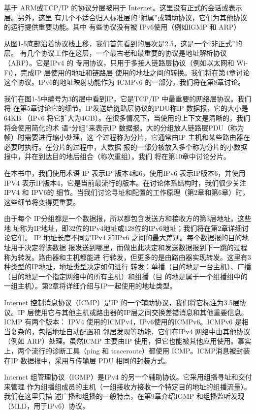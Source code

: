 基于 ARM或TCP/IP 的协议分层被用于 Internet。这里没有正式的会话或表示层。另外，这里
有几个不适合归人标准层的“附属”或辅助协议，它们为其他协议的运行提供重要功能。其中
有些协议没有被 IPv6使用（例如IGMP 和 ARP）

从图1-5底部沿着协议栈上移，我们首先看到的层次是2.5，这是一个“非正式”的层。
有几个协议工作在这层，一个最古老和最重要的协议是地址解析协议（ARP）。它是IPv4 的
专用协议，只用于多接人链路层协议（例如以太网和 Wi-Fi），完成IP 层使用的地址和链路层
使用的地址之间的转换。我们将在第4章讨论这个协议。IPv6的地址映射功能作为 ICMPv6
的一部分，我们将在第8章讨论。

我们在图1-5中编号为3的层中看到IP，它是TCP/IP 中最重要的网络层协议。我们将
在第5章讨论它的细节。IP发送给链路层协议的PDU称IP 数据报，它的大小是64KB
（IPv6 将它扩大为4GB）。在很多情况下，当使用的上下文是清晰的，我们将会使用简化的术
语“分组”来表示IP 数据报。大的分组放人链路层PDU（称为帧）时需要进行缩小处理，这
个过程称为分片，它通常由IP 主机和某些路由器在必要时执行。在分片的过程中，大数据
报的一部分被放入多个称为分片的小数据报中，并在到达目的地后组合（称次重组）。我们
将在第10章中讨论分片。

在本书中，我们使用术语 IP 表示IP 版本4和6，使用IPv6 表示IP版本6，并使用 IPV4
表示IP版本4，它是当前最流行的版本。在讨论体系结构时，我们很少关注IPV4 和 IPV6的
细节。当我们讨论寻址和配置的工作原理（第2章和第6章）时，这些细节将变得更重要。

由于每个 IP分组都是一个数据报，所以都包含发送方和接收方的第3层地址。这些地
址称为IP地址，即32位的IPv4地址或128位的IPv6地址；我们将在第2章详细讨论它们。
IP 地址长度不同是IPv4 和IPv6 之间的最大差别。每个数据报的目的地址用于决定将该数据
报发送到哪里，而做出此决定和发送数据报到下一跳的过程称为转发。路由器和主机都能进
行转发，但更多的是由路由器实现转发。这里有3种类型的IP地址，地址类型决定如何进行
转发：单播（目的地是一台主机）、广播（目的地是一个指定网络中的所有主机）和组播（目
的地是属于一个组播组中的一组主机）。第2章将详细介绍与IP一起使用的地址类型。

Internet 控制消息协议（ICMP）是IP 的一个辅助协议，我们将它标注为3.5层协议。IP
层使用它与其他主机或路由器的IP层之间交换差错消息和其他重要信息。ICMP 有两个版本：
IPV4 使用的ICMPv4，IPv6使用的ICMPv6。ICMPv6 是相当复杂的，包括地址自动配置和
邻居发现等功能，它们在IPv4 网络中由其他协议（例如 ARP）处理。虽然ICMP 主要由IP
使用，但它也能被其他应用使用。事实上，两个流行的诊断工具（ping 和 traceroute）都使用
ICMP。ICMP消息被封装在IP 数据报中，采用与传输层 PDU 相同的封装方式。

Internet 组管理协议（IGMP）是IPv4 的另一个辅助协议。它采用组播寻址和交付来管理
作为组播组成员的主机（一组接收方接收一个特定目的地址的组播流量）。我们在这里只描
述广播和组播的一般特点，在第9章介绍IGMP 和组播监听发现（MLD，用于IPv6）协议。

